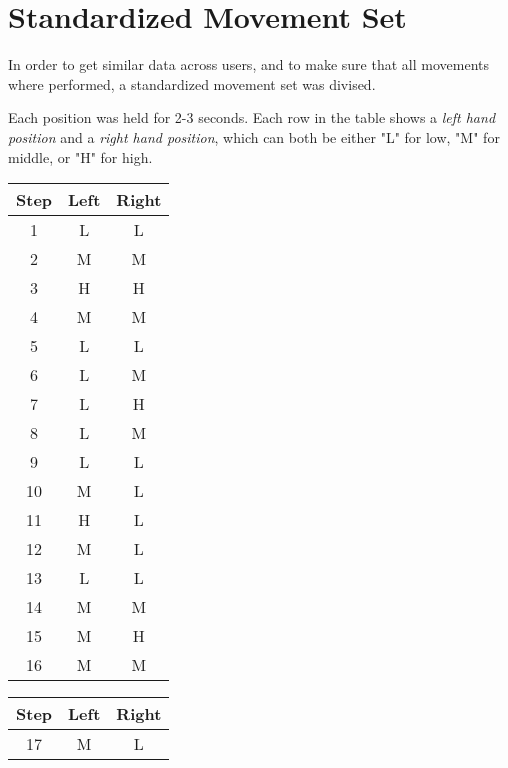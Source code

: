\chapter{Standardized Movement Set}
\label{appendix: standardized movement set}

In order to get similar data across users, and to make sure that all movements where performed, a standardized movement set was divised.

Each position was held for 2-3 seconds. 
Each row in the table shows a \textit{left hand position} and a \textit{right hand position}, which can both be either "L" for low, "M" for middle, or "H" for high.


\begin{table}[h]
    \centering
    \begin{subtable}%
    \centering
    \begin{tabular}[t]{||c|c|c||}
    \hline
    Step & Left & Right\\
    \hline \hline
      1 & L  & L\\
      \hline
      2 & M  &M\\
      \hline
      3 & H & H\\ 
      \hline
      4 & M & M\\ 
      \hline
      5 & L & L\\ 
      \hline
      6 & L & M\\ 
      \hline
      7 & L & H\\ 
      \hline
      8 & L & M\\ 
      \hline
      9 & L & L\\ 
      \hline
      10 & M & L\\
      \hline
      11 & H & L \\
      \hline
      12 & M & L \\
      \hline
      13 & L & L \\
      \hline
      14 & M & M \\
      \hline
      15 & M & H \\
      \hline
      16 & M & M \\
      \hline
    \end{tabular}
    \end{subtable}
    \begin{subtable}%
    \centering
    \begin{tabular}[t]{||c|c|c||}
    \hline
    Step & Left & Right\\
    \hline \hline
      17 & M & L \\

\end{tabular}
\end{subtable}
\end{table}

